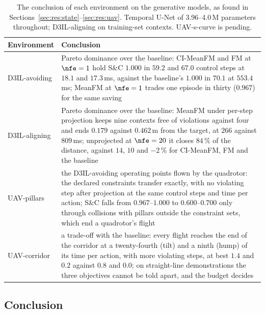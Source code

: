 \begin{table}[htpb]
  \caption[Generative models across environments]{The conclusion of each environment on the generative models,
  as found in Sections~\ref{sec:res:state}--\ref{sec:res:uav}. Temporal U-Net of 3.96--4.0\,M parameters
  throughout; D3IL-aligning on training-set contexts. UAV-s-curve is pending.}
  \label{tab:summary-models}
  \centering
  \small
  \begin{tabularx}{\linewidth}{@{}p{2.2cm} L@{}}
    \toprule
    Environment & Conclusion \\
    \midrule
    D3IL-avoiding & Pareto dominance over the baseline: CI-MeanFM and FM at $\nfe=1$ hold S\&C $1.000$ in $59.2$
                    and $67.0$ control steps at $18.1$ and $17.3$\,ms, against the baseline's $1.000$ in $70.1$ at
                    $553.4$\,ms; MeanFM at $\nfe=1$ trades one episode in thirty ($0.967$) for the same saving \\
    D3IL-aligning & Pareto dominance over the baseline: MeanFM under per-step projection keeps nine contexts free of
                    violations against four and ends $0.179$ against $0.462$\,m from the target, at $266$ against
                    $809$\,ms; unprojected at $\nfe=20$ it closes $84\,\%$ of the distance, against $14$, $10$ and
                    $-2\,\%$ for CI-MeanFM, FM and the baseline \\
    UAV-pillars   & the D3IL-avoiding operating points flown by the quadrotor: the declared constraints transfer
                    exactly, with no violating step after projection at the same control steps and time per
                    action; S\&C falls from $0.967$--$1.000$ to $0.600$--$0.700$ only through collisions with
                    pillars outside the constraint sets, which end a quadrotor's flight \\
    UAV-corridor  & a trade-off with the baseline: every flight reaches the end of the corridor at a twenty-fourth
                    (tilt) and a ninth (hump) of its time per action, with more violating steps, at best $1.4$ and
                    $0.2$ against $0.8$ and $0.0$; on straight-line demonstrations the three objectives cannot be
                    told apart, and the budget decides \\
    \bottomrule
  \end{tabularx}
\end{table}



\subsection{Conclusion}\label{sec:res:summary:conclusion}

